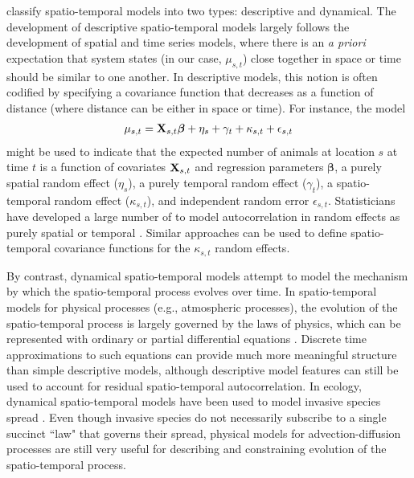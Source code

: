 \documentclass[12pt,english]{article}
\begin{document}
\begin{spacing}{1.9}
\citet{CressieWikle2011} classify spatio-temporal models into two types: descriptive and dynamical.  The development of descriptive spatio-temporal models largely follows the development of spatial and time series models, where there is an {\it a priori} expectation that system states (in our case, $\mu_{s,t}$) close together in space or time should be similar to one another.  In descriptive models, this notion is often codified by specifying a covariance function that decreases as a function of distance (where distance can be either in space or time).  For instance, the model
\begin{eqnarray}
  \mu_{s,t} = {\bf X}_{s,t} \boldsymbol{\beta} + \eta_s + \gamma_t + \kappa_{s,t} + \epsilon_{s,t} \label{eq:glmm}
\end{eqnarray}
might be used to indicate that the expected number of animals at location $s$ at time $t$ is a function of covariates ${\bf X}_{s,t}$ and regression parameters $\boldsymbol{\beta}$, a purely spatial random effect ($\eta_s$), a purely temporal random effect ($\gamma_t$), a spatio-temporal random effect ($\kappa_{s,t}$), and independent random error $\epsilon_{s,t}$.  Statisticians have developed a large number of to model autocorrelation in random effects as purely spatial \citep[e.g., geostatistical models, Gaussian Markov random fields (GMRFs); see e.g.,][]{Cressie1993,BanerjeeEtAl2004,RueHeld2005} or temporal \citep[e.g., AR(p) processes and ARIMA models;][]{BoxEtAl2008,PradoWest2010}.  Similar approaches can be used to define spatio-temporal covariance functions \citep{CressieWikle2011} for the $\kappa_{s,t}$ random effects.

By contrast, dynamical spatio-temporal models attempt to model the mechanism by which the spatio-temporal process evolves over time.  In spatio-temporal models for physical processes (e.g., atmospheric processes), the evolution of the spatio-temporal process is largely governed by the laws of physics, which can be represented with ordinary or partial differential equations \citep{WikleEtAl2001,WikleHooten2010}.  Discrete time approximations to such equations can provide much more meaningful structure than simple descriptive models, although descriptive model features can still be used to account for residual spatio-temporal autocorrelation.  In ecology, dynamical spatio-temporal models have been used to model invasive species spread \citep{Wikle2003,HootenEtAl2007,HootenWikle2008}.  Even though invasive species do not necessarily subscribe to a single succinct ``law" that governs their spread, physical models for advection-diffusion processes are still very useful for describing and constraining evolution of the spatio-temporal process.


\end{spacing}
\end{document}
